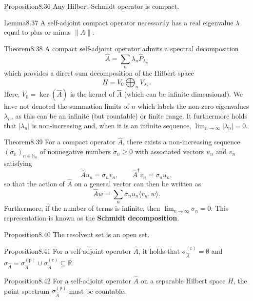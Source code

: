 \begin{res}{Proposition}{8.36}
Any Hilbert-Schmidt operator is compact.
\end{res}

\begin{res}{Lemma}{8.37}
A self-adjoint compact operator necessarily has a real eigenvalue $\lambda$ equal to plus or minus $\|A\|$.
\end{res}

\begin{res}{Theorem}{8.38}
A compact self-adjoint operator admits a spectral decomposition
\begin{equation}\hat A=\sum_n\lambda_n\hat P_{\lambda_n}\tag{8.116}\end{equation}
which provides a direct sum decomposition of the Hilbert space
\begin{equation}H=V_0\bigoplus_nV_{\lambda_n}.\tag{8.117}\end{equation}
Here, $V_0=\ker(\hat A)$ is the kernel of $\hat A$ (which can be infinite dimensional). We have not denoted the summation limits of $n$ which labels the non-zero eigenvalues $\lambda_n$, as this can be an infinite (but countable) or finite range. It furthermore holds that $|\lambda_n|$ is non-increasing and, when it is an infinite sequence, $\lim_{n\to\infty}|\lambda_n|=0$.
\end{res}

\begin{res}{Theorem}{8.39}
For a compact operator $\hat A$, there exists a non-increasing sequence $(\sigma_n)_{n\in\mathbb N_0}$ of nonnegative numbers $\sigma_n\ge0$ with associated vectors $u_n$ and $v_n$ satisfying
\begin{equation}\hat Au_n=\sigma_nv_n,\qquad\hat A^\dagger v_n=\sigma_nu_n,\tag{8.118}\end{equation}
so that the action of $\hat A$ on a general vector can then be written as
\begin{equation}\hat Aw=\sum_n\sigma_nu_n\langle v_n,w\rangle.\tag{8.119}\end{equation}
Furthermore, if the number of terms is infinite, then $\lim_{n\to\infty}\sigma_n=0$. This representation is known as the \textbf{Schmidt decomposition}.
\end{res}

\begin{res}{Proposition}{8.40}
The resolvent set is an open set.
\end{res}

\begin{res}{Proposition}{8.41}
For a self-adjoint operator $\hat A$, it holds that $\sigma^{(\mathrm r)}_{\hat A}=\emptyset$ and $\sigma_{\hat A}=\sigma^{(\mathrm p)}_{\hat A}\cup\sigma^{(\mathrm c)}_{\hat A}\subseteq\mathbb R$.
\end{res}

\begin{res}{Proposition}{8.42}
For a self-adjoint operator $\hat A$ on a separable Hilbert space $H$, the point spectrum $\sigma^{(\mathrm p)}_{\hat A}$ must be countable.
\end{res}
